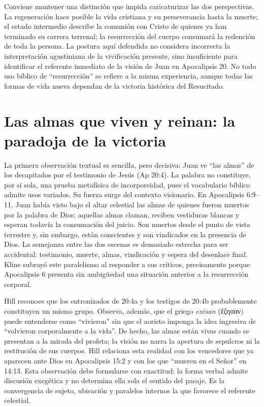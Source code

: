 Conviene mantener una distinción que impida caricaturizar las dos perspectivas.
La regeneración hace posible la vida cristiana y su perseverancia hasta la muerte; el estado intermedio describe la comunión con Cristo de quienes ya han terminado su carrera terrenal; la resurrección del cuerpo consumará la redención de toda la persona.
La postura aquí defendida no considera incorrecta la interpretación agustiniana de la vivificación presente, sino insuficiente para identificar el referente inmediato de la visión de Juan en Apocalipsis 20.
No todo uso bíblico de \enquote{resurrección} se refiere a la misma experiencia, aunque todas las formas de vida nueva dependan de la victoria histórica del Resucitado.

\section{Las almas que viven y reinan: la paradoja de la victoria}

La primera observación textual es sencilla, pero decisiva: Juan ve \enquote{las almas} de los decapitados por el testimonio de Jesús (Ap 20:4).
La palabra no constituye, por sí sola, una prueba metafísica de incorporeidad, pues el vocabulario bíblico admite usos variados.
Su fuerza surge del contexto visionario.
En Apocalipsis 6:9--11, Juan había visto bajo el altar celestial las almas de quienes fueron muertos por la palabra de Dios; aquellas almas claman, reciben vestiduras blancas y esperan todavía la consumación del juicio.
Son muertos desde el punto de vista terrestre y, sin embargo, están conscientes y son vindicados en la presencia de Dios.
La semejanza entre las dos escenas es demasiado estrecha para ser accidental: testimonio, muerte, almas, vindicación y espera del desenlace final.
Kline subrayó este paralelismo al responder a sus críticos, precisamente porque Apocalipsis 6 presenta sin ambigüedad una situación anterior a la resurrección corporal. \autocite[110--119]{kline1976}

Hill reconoce que los entronizados de 20:4a y los testigos de 20:4b probablemente constituyen un mismo grupo.
Observa, además, que el griego \emph{ezēsan} (ἔζησαν) puede entenderse como \enquote{vivieron} sin que el aoristo imponga la idea ingresiva de \enquote{volvieron corporalmente a la vida}.
De hecho, las almas están vivas cuando se presentan a la mirada del profeta; la visión no narra la apertura de sepulcros ni la restitución de sus cuerpos.
Hill relaciona esta realidad con los vencedores que ya aparecen ante Dios en Apocalipsis 15:2 y con los que \enquote{mueren en el Señor} en 14:13. \autocite[53--54 del PDF del curso]{hill2016}
Esta observación debe formularse con exactitud: la forma verbal admite discusión exegética y no determina ella sola el sentido del pasaje.
Es la convergencia de sujeto, ubicación y paralelos internos la que favorece el referente celestial.

